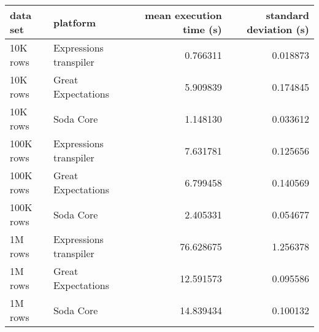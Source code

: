 \begin{tabular}{llrr}
\toprule
data set & platform & mean execution time (s) & standard deviation (s) \\
\midrule
10K rows & Expressions transpiler & 0.766311 & 0.018873 \\
10K rows & Great Expectations & 5.909839 & 0.174845 \\
10K rows & Soda Core & 1.148130 & 0.033612 \\
100K rows & Expressions transpiler & 7.631781 & 0.125656 \\
100K rows & Great Expectations & 6.799458 & 0.140569 \\
100K rows & Soda Core & 2.405331 & 0.054677 \\
1M rows & Expressions transpiler & 76.628675 & 1.256378 \\
1M rows & Great Expectations & 12.591573 & 0.095586 \\
1M rows & Soda Core & 14.839434 & 0.100132 \\
\bottomrule
\end{tabular}
